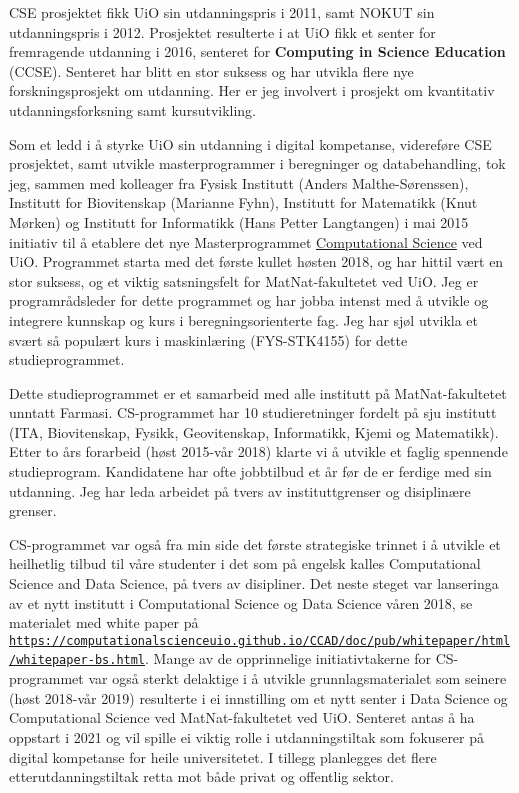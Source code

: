 \documentclass[aps,floatfix,preprint]{revtex4-1}
\begin{document}
CSE prosjektet fikk UiO sin utdanningspris i 2011, samt NOKUT sin
utdanningspris i 2012. Prosjektet resulterte i at UiO fikk et
senter for fremragende utdanning i 2016, senteret for \textbf{Computing in
Science Education} (CCSE). Senteret har blitt en stor suksess og har
utvikla flere nye forskningsprosjekt om utdanning. Her er jeg involvert i
prosjekt om kvantitativ utdanningsforksning samt kursutvikling.

Som et ledd i å styrke UiO sin utdanning i digital kompetanse,
videreføre CSE prosjektet, samt utvikle masterprogrammer i beregninger
og databehandling, tok jeg, sammen med kolleager fra Fysisk Institutt (Anders Malthe-Sørenssen), Institutt for Biovitenskap (Marianne Fyhn), Institutt for Matematikk (Knut Mørken) og Institutt for Informatikk (Hans Petter Langtangen) i mai  2015 initiativ til å etablere det nye
Masterprogrammet \href{{https://www.uio.no/english/studies/programmes/computational-science-master/index.html}}{Computational
Science}
ved UiO. Programmet starta med det første kullet høsten 2018, og har
hittil vært en stor suksess, og et viktig satsningsfelt for
MatNat-fakultetet ved UiO. Jeg er programrådsleder for dette
programmet og har jobba intenst med å utvikle og integrere kunnskap og
kurs i beregningsorienterte fag. Jeg har sjøl utvikla et svært så
populært kurs i maskinlæring (FYS-STK4155) for dette
studieprogrammet.

Dette studieprogrammet er et samarbeid med alle institutt på
MatNat-fakultetet unntatt Farmasi. CS-programmet har 10
studieretninger fordelt på sju institutt (ITA, Biovitenskap, Fysikk,
Geovitenskap, Informatikk, Kjemi og Matematikk). Etter to års
forarbeid (høst 2015-vår 2018) klarte vi å utvikle et faglig spennende
studieprogram. Kandidatene har ofte jobbtilbud et år før de er ferdige
med sin utdanning.  Jeg har leda arbeidet på tvers av instituttgrenser og disiplinære grenser.


CS-programmet var også fra min side det første strategiske trinnet i å
utvikle et heilhetlig tilbud til våre studenter i det som på engelsk
kalles Computational Science and Data Science, på tvers av
disipliner. Det neste steget var lanseringa av et nytt institutt i
Computational Science og Data Science våren 2018, se materialet med
white paper på
\href{{https://computationalscienceuio.github.io/CCAD/doc/pub/whitepaper/html/whitepaper-bs.html}}{\nolinkurl{https://computationalscienceuio.github.io/CCAD/doc/pub/whitepaper/html/whitepaper-bs.html}}.
Mange av de opprinnelige initiativtakerne for CS-programmet var også sterkt
delaktige i å utvikle grunnlagsmaterialet som seinere (høst 2018-vår 2019) resulterte i ei innstilling
om et nytt senter i Data Science og Computational Science ved MatNat-fakultetet ved UiO.
Senteret antas å ha oppstart i 2021 og vil spille ei viktig rolle i utdanningstiltak som fokuserer på digital kompetanse for heile universitetet. I tillegg planlegges det flere etterutdanningstiltak retta mot både privat og offentlig sektor.
\end{document}
